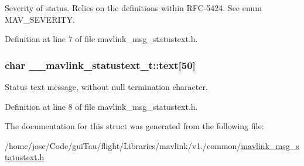 Severity of status. Relies on the definitions within R\-F\-C-\/5424. See enum M\-A\-V\-\_\-\-S\-E\-V\-E\-R\-I\-T\-Y. 



Definition at line 7 of file mavlink\-\_\-msg\-\_\-statustext.\-h.

\hypertarget{struct____mavlink__statustext__t_ad841b35268fabb3a101c2524da5a31be}{
\subsubsection[{text}]{\setlength{\rightskip}{0pt plus 5cm}char \-\_\-\-\_\-mavlink\-\_\-statustext\-\_\-t\-::text\mbox{[}50\mbox{]}}}\label{struct____mavlink__statustext__t_ad841b35268fabb3a101c2524da5a31be}


Status text message, without null termination character. 



Definition at line 8 of file mavlink\-\_\-msg\-\_\-statustext.\-h.



The documentation for this struct was generated from the following file\-:\begin{DoxyCompactItemize}
\item 
/home/jose/\-Code/gui\-Tau/flight/\-Libraries/mavlink/v1./common/\hyperlink{mavlink__msg__statustext_8h}{mavlink\-\_\-msg\-\_\-statustext.\-h}\end{DoxyCompactItemize}
